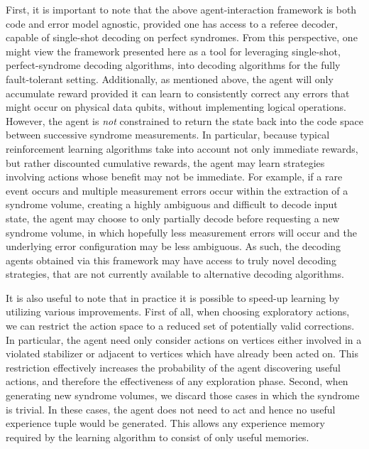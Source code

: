 \documentclass[twocolumn,preprintnumbers,amsmath,amssymb,notitlepage,nofootinbib,longbibliography,superscriptaddress,aps,pra,10pt]{revtex4-1}
\begin{document}
	First, it is important to note that the above agent-interaction framework is both code and error model agnostic, provided one has access to a referee decoder, capable of single-shot decoding on perfect syndromes.
	From this perspective, one might view the framework presented here as a tool for leveraging single-shot, perfect-syndrome decoding algorithms, into decoding algorithms for the fully fault-tolerant setting.
	Additionally, as mentioned above, the agent will only accumulate reward provided it can learn to consistently correct any errors that might occur on physical data qubits, without implementing logical operations.
	However, the agent is \textit{not} constrained to return the state back into the code space between successive syndrome measurements.
	In particular, because typical reinforcement learning algorithms take into account not only immediate rewards, but rather discounted cumulative rewards, the agent may learn strategies involving actions whose benefit may not be immediate.
	For example, if a rare event occurs and multiple measurement errors occur within the extraction of a syndrome volume, creating a highly ambiguous and difficult to decode input state, the agent may choose to only partially decode before requesting a new syndrome volume, in which hopefully less measurement errors will occur and the underlying error configuration may be less ambiguous.
	As such, the decoding agents obtained via this framework may have access to truly novel decoding strategies, that are not currently available to alternative decoding algorithms.

	It is also useful to note that in practice it is possible to speed-up learning by utilizing various improvements.
	First of all, when choosing exploratory actions, we can restrict the action space to a reduced set of potentially valid corrections.
	In particular, the agent need only consider actions on vertices either involved in a violated stabilizer or adjacent to vertices which have already been acted on.
	This restriction effectively increases the probability of the agent discovering useful actions, and therefore the effectiveness of any exploration phase.
	Second, when generating new syndrome volumes, we discard those cases in which the syndrome is trivial.
	In these cases, the agent does not need to act and hence no useful experience tuple would be generated.
	This allows any experience memory required by the learning algorithm to consist of only useful memories.
\end{document}
